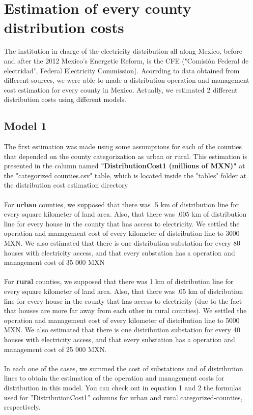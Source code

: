 \documentclass[•]{article}
\begin{document}
\section{Estimation of every county distribution costs}
The institution in charge of the electricity distribution all along Mexico, before and after the 2012 Mexico's Energetic Reform, is the CFE ("Comisión Federal de electridad", Federal Electricity Commission). Acorrding to data obtained from different sources, we were able to made a distribution operation and management cost estimation for every county in Mexico. Actually, we estimated 2 different distribution costs using different models.
\subsection{Model 1}
The first estimation was made using some assumptions for each of the counties that depended on the county categorization as urban or rural. This estimation is presented in the column named \textbf{"DistributionCost1 (millions of MXN)"} at the "categorized counties.csv" table, which is located inside the "tables" folder at the distribution cost estimation directory
\\
\\For \textbf{urban} counties, we supposed that there was .5 km of distribution line for every square kilometer of land area. Also, that there was .005 km of distribution line for every house in the county that has access to electricity. We settled the operation and management cost of every kilometer of distribution line to 3000 MXN. We also estimated that there is one distribution substation for every  80 houses with electricity access, and that every substation has a operation and management cost of 35 000 MXN
\\
\\For \textbf{rural} counties, we supposed that there was 1 km of distribution line for every square kilometer of land area. Also, that there was .05 km of distribution line for every house in the county that has access to electricity (due to the fact that houses are more far away from each other in rural counties). We settled the operation and management cost of every kilometer of distribution line to 5000 MXN. We also estimated that there is one distribution substation for every  40 houses with electricity access, and that every substation has a operation and management cost of 25 000 MXN.
\\
\\In each one of the cases, we summed the cost of substations and of distribution lines to obtain the estimation of the operation and management costs for distribution in this model. You can check out in equation 1 and 2 the formulas used for ''DistributionCost1'' columns for urban and rural categorized-counties, respectively.
\end{document}
